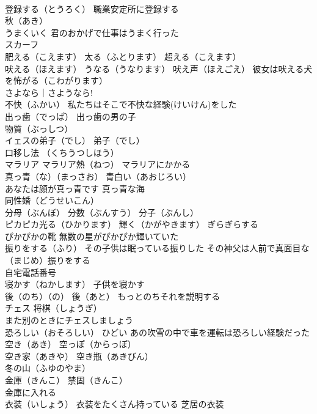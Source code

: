 \documentclass[8pt]{extreport}
\begin{document}
\begin{CJK}{UTF8}{min}
\\	登録する（とうろく） 職業安定所に登録する
\\	秋（あき）
\\	うまくいく 君のおかげで仕事はうまく行った
\\	スカーフ 
\\	肥える（こえます） 太る（ふとります） 超える（こえます）
\\	吠える（ほえます） うなる（うなります） 吠え声（ほえごえ） 彼女は吠える犬を怖がる（こわがります）
\\	さよなら｜さようなら!
\\	不快（ふかい） 私たちはそこで不快な経験(けいけん)をした
\\	出っ歯（でっぱ） 出っ歯の男の子
\\	物質（ぶっしつ）
\\	イェスの弟子（でし） 弟子（でし）
\\	口移し法 （くちうつしほう）
\\	マラリア マラリア熱（ねつ） マラリアにかかる
\\	真っ青（な）（まっさお） 青白い（あおじろい）
\\	あなたは顔が真っ青です 真っ青な海
\\	同性婚（どうせいこん）
\\	分母（ぶんぼ） 分数（ぶんすう） 分子（ぶんし）
\\	ピカピカ光る（ひかります） 輝く（かがやきます） ぎらぎらする　
\\	ぴかぴかの靴 無数の星がぴかぴか輝いていた
\\	振りをする（ふり） その子供は眠っている振りした その神父は人前で真面目な（まじめ）振りをする
\\	自宅電話番号
\\	寝かす（ねかします） 子供を寝かす
\\	後（のち）（の） 後（あと） もっとのちそれを説明する
\\	チェス 将棋（しょうぎ）
\\	また別のときにチェスしましょう
\\	恐ろしい（おそろしい） ひどい あの吹雪の中で車を運転は恐ろしい経験だった
\\	空き（あき） 空っぽ（からっぽ）
\\	空き家（あきや） 空き瓶（あきびん）
\\	冬の山（ふゆのやま）
\\	金庫（きんこ） 禁固（きんこ）
\\	金庫に入れる
\\	衣装（いしょう） 衣装をたくさん持っている 芝居の衣装

\end{CJK}
\end{document}
